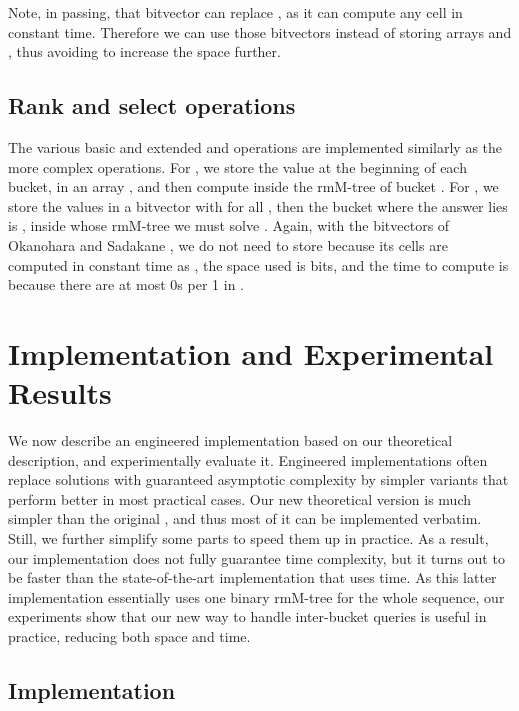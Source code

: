 \documentclass[11pt]{article}
\newcommand{\0}{\mathit{0}}
\newcommand{\1}{\mathit{1}}
\begin{document}
Note, in passing, that bitvector  can replace , as it can compute
any cell  in constant time.
Therefore we can use those bitvectors instead of storing arrays  and ,
thus avoiding to increase the space further.

\subsection{Rank and select operations} \label{sec:rs}

The various basic and extended  and  operations are 
implemented similarly as the more complex operations. For , we 
store the  value at the beginning of each bucket, in an array 
, and then compute  inside 
the rmM-tree of bucket . For ,
we store the  values in a bitvector  with 
 for all , then the bucket  where the answer lies is 
, inside whose rmM-tree we must solve 
. Again, with the bitvectors of Okanohara and Sadakane
\cite{OS07}, we do not need to store  because its cells are computed in
constant time as , the space
used is  bits, and the time to compute
 is  because there are at most  0s per 1 in
.

\section{Implementation and Experimental Results}

We now describe an engineered implementation based on our theoretical 
description, and experimentally evaluate it. Engineered implementations often
replace solutions with guaranteed asymptotic complexity by simpler variants 
that perform better in most practical cases. Our new theoretical version is
much simpler than the original \cite{NS14}, and thus most of it can be
implemented verbatim. Still, we further simplify some parts to speed them up
in practice. As a result, our implementation does not fully guarantee
 time complexity, but it turns out to be faster than the 
state-of-the-art implementation that uses  time. As this latter
implementation essentially uses one binary rmM-tree for the whole sequence, our
experiments show that our new way to handle inter-bucket queries is useful in 
practice, reducing both space and time.

\subsection{Implementation}
\end{document}
